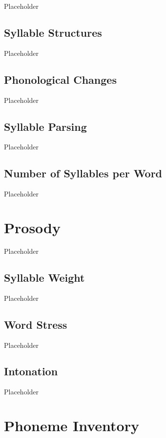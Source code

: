 Placeholder

\subsection{Syllable Structures}
\label{subsec:ank-syll-struc}

Placeholder

\subsection{Phonological Changes}
\label{subsec:ank-phone-changes}

Placeholder

\subsection{Syllable Parsing}
\label{subsec:ank-syll-parse}

Placeholder

\subsection{Number of Syllables per Word}
\label{subsec:ank-num-syll}

Placeholder

\section{\langank{} Prosody}
\label{sec:ank-prosody}

Placeholder

\subsection{Syllable Weight}
\label{subsec:ank-syll-weight}

Placeholder

\subsection{Word Stress}
\label{subsec:ank-word-stress}

Placeholder

\subsection{Intonation}
\label{subsec:ank-intonation}

Placeholder

\section{\langrdk{} Phoneme Inventory}
\label{sec:rdk-phone-inventory}

